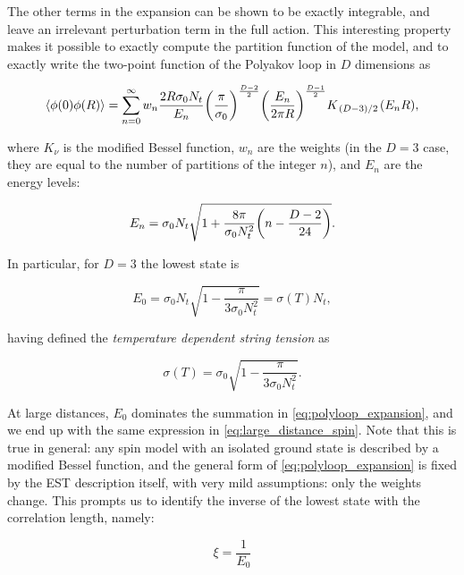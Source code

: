\documentclass[reqno,12pt]{article}
\numberwithin{equation}{section}
\begin{document}
The other terms in the expansion can be shown to be exactly integrable, and leave an irrelevant perturbation term in the full action.
This interesting property makes it possible to exactly compute the partition function of the model, and to exactly write the two-point
function of the Polyakov loop in $D$ dimensions as

\begin{equation} \label{eq:polyloop_expansion}
	\expval{\phi(0) \phi(R)} = 
	\sum_{n=0}^{\infty} w_n \frac{2R\sigma_0N_t}{E_n} \qty(\frac{\pi}{\sigma_0})^{\frac{D-2}{2}} 
	\qty(\frac{E_n}{2\pi R})^{\frac{D-1}{2}} K_{\flatfrac{(D-3)}{2}}(E_n R),
\end{equation}

where $K_\nu$ is the modified Bessel function, $w_n$ are the weights (in the $D=3$ case, they are equal to the number of partitions
of the integer $n$), and $E_n$ are the energy levels:

\begin{equation}
	E_n = \sigma_0 N_t \sqrt{1 + \frac{8\pi}{\sigma_0 N_t^2}\qty(n - \frac{D-2}{24})}.
\end{equation}

In particular, for $D=3$ the lowest state is

\begin{equation} \label{eq:lowest_state}
	E_0 = \sigma_0 N_t \sqrt{1 - \frac{\pi}{3 \sigma_0 N_t^2}} = \sigma(T) N_t,
\end{equation}

having defined the \textit{temperature dependent string tension} as

\begin{equation} \label{eq:sigma_t}
	\sigma(T) = \sigma_0 \sqrt{1 - \frac{\pi}{3\sigma_0 N_t^2}}.
\end{equation}

At large distances, $E_0$ dominates the summation in \eqref{eq:polyloop_expansion}, and we end up with the same expression in
\eqref{eq:large_distance_spin}. Note that this is true in general: any spin model with an isolated ground state is described
by a modified Bessel function, and the general form of \eqref{eq:polyloop_expansion} is fixed by the EST description itself, with very
mild assumptions: only the weights change. This prompts us to identify the inverse of the lowest state with the correlation length, namely:

\begin{equation} \label{eq:correlation_length}
	\xi = \frac{1}{E_0}
\end{equation}
\end{document}
